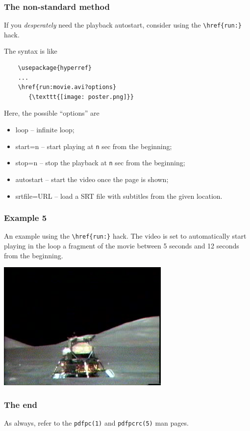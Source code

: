 \documentclass{beamer}
\newcommand{\opt}[1]{\texttt{#1}\xspace}
\begin{document}
\begin{frame}[fragile]
  \frametitle{The non-standard method}

  If you {\em desperately} need the playback autostart, consider
  using the \opt{\textbackslash href\{run:\}} hack.

  The syntax is like

  \begin{lstlisting}
    \usepackage{hyperref}
    ...
    \href{run:movie.avi?options}
       {\texttt{[image: poster.png]}}
  \end{lstlisting}

  Here, the possible ``options'' are
  \begin{itemize}
    \item loop -- infinite loop;
    \item start=n -- start playing at \opt{n} sec from the beginning;
    \item stop=n -- stop the playback at \opt{n} sec from the beginning;
    \item autostart -- start the video once the page is shown;
    \item srtfile=URL -- load a SRT file with subtitles from the given
      location.
  \end{itemize}

\end{frame}

\begin{frame}
  \frametitle{Example 5}

  An example using the \opt{\textbackslash href\{run:\}} hack. The
  video is set to automatically start playing in the loop a fragment of the
  movie between 5 seconds and 12 seconds from the beginning.

  \vspace{5pt}

  \begin{center}
    \href{run:apollo17.avi?autostart&loop&start=5&stop=12}
       {\includegraphics[height=0.7\textheight]{apollo17.jpg}}
  \end{center}
\end{frame}

\begin{frame}
  \frametitle{The end}
  
  As always, refer to the \opt{pdfpc(1)} and \opt{pdfpcrc(5)} man pages.

\end{frame}
\end{document}
